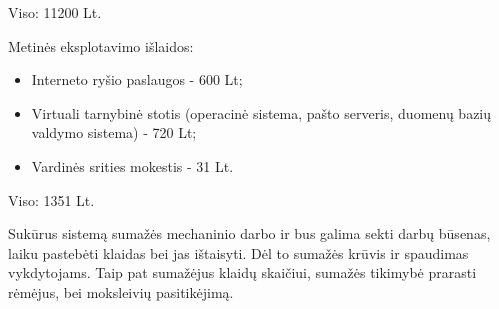 Viso: 11200 Lt.

Metin\.{e}s eksplotavimo išlaidos:
\begin{itemize}
  \item Interneto ryšio paslaugos - 600 Lt;
  \item Virtuali tarnybin\.{e} stotis (operacin\.{e} sistema, pašto 
    serveris, duomen\k{u} bazi\k{u} valdymo sistema) - 720 Lt;
  \item Vardin\.{e}s srities mokestis - 31 Lt.
\end{itemize}

Viso: 1351 Lt.

Sukūrus sistemą sumažės mechaninio darbo ir bus galima sekti darbų būsenas,
laiku pastebėti klaidas bei jas ištaisyti. Dėl to sumažės krūvis ir 
spaudimas vykdytojams. Taip pat sumažėjus klaidų skaičiui, sumažės
tikimybė prarasti rėmėjus, bei moksleivių pasitikėjimą. 